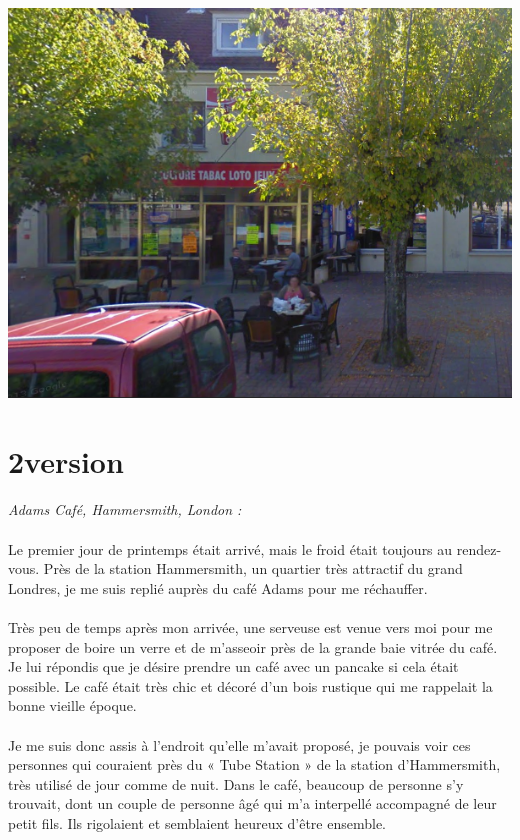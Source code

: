 \begin{center}
\includegraphics[scale=0.5]{BarArcis.png}
\end{center}

\section{2\ieme version}
\paragraph{}
\emph{Adams Café, Hammersmith, London :}

\paragraph{}
Le premier jour de printemps était arrivé, mais le froid était toujours au
rendez-vous. Près de la station Hammersmith, un quartier très attractif du
grand Londres, je me suis replié auprès du café Adams pour me réchauffer.

\paragraph{}
Très peu de temps après mon arrivée, une serveuse est venue vers moi pour me
proposer de boire un verre et de m’asseoir près de la grande baie vitrée du
café. Je lui répondis que je désire prendre un café avec un pancake si cela
était possible. Le café était très chic et décoré d’un bois rustique qui me
rappelait la bonne vieille époque.

\paragraph{}
Je me suis donc assis à l’endroit qu’elle m’avait proposé, je pouvais voir ces
personnes qui couraient près du « Tube Station » de la station d’Hammersmith,
très utilisé de jour comme de nuit. Dans le café, beaucoup de personne s’y
trouvait, dont un couple de personne âgé qui m’a interpellé accompagné de leur
petit fils. Ils rigolaient et semblaient heureux d’être ensemble.

